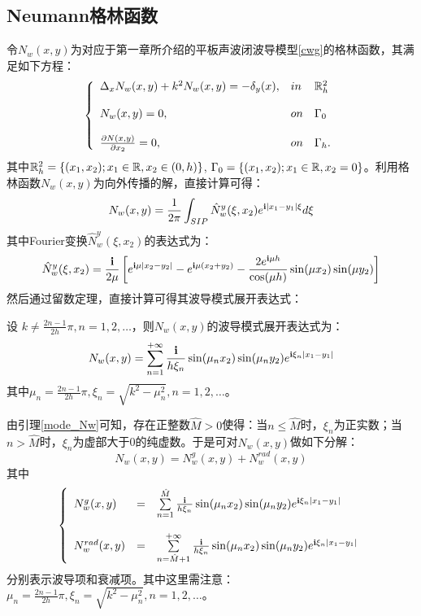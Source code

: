 \subsection{Neumann格林函数}
令$N_w(x,y)$为对应于第一章所介绍的平板声波闭波导模型\ref{cwg}的格林函数，其满足如下方程：
\begin{eqnarray}\label{cwg_neumann}
\left\{
\begin{array}{lll}
\Delta_xN_w(x,y)+k^2N_w(x,y)=-\delta_y(x),&in& \mathbb{R}^2_h\\
& &\\
N_w(x,y)=0, &on&\Gamma_0\\
& &\\
\frac{\partial N(x,y)}{\partial x_2}=0, &on&\Gamma_h.
\end{array}
\right.
\end{eqnarray}
其中$\mathbb{R}^2_h=\{(x_1,x_2);x_1\in \mathbb{R}, x_2\in(0,h)\}$, $ \Gamma_0=\{(x_1,x_2);x_1\in \mathbb{R}, x_2=0\}$。利用格林函数$N_w(x,y)$为向外传播的解，直接计算可得：
\begin{equation}\label{f_Nw}
 N_w(x,y)=\frac{1}{2\pi}\int_{SIP}\hat N_w^y(\xi,x_2)e^{\mathbf{i}|x_1-y_1|\xi}d\xi
\end{equation}
其中Fourier变换$\hat N_w^y(\xi,x_2)$的表达式为：
\begin{equation}
\hat N_w^y(\xi,x_2)=\frac{\mathbf{i}}{2\mu}\left[e^{\mathbf{i}\mu|x_2-y_2|}-e^{\mathbf{i}\mu(x_2+y_2)}-\frac{2e^{\mathbf{i}\mu h}}{\cos(\mu h)}\sin(\mu x_2)\sin(\mu y_2)\right]
\end{equation}
然后通过留数定理，直接计算可得其波导模式展开表达式：
\begin{lemma}\label{mode_Nw}
设 $k\neq\frac{2n-1}{2h}\pi, n=1,2,\ldots$，则$N_w(x,y)$的波导模式展开表达式为：	
\begin{equation}
	N_w(x,y)=\sum\limits_{n=1}^{+\infty}\frac{\mathbf{i}}{h\xi_n}\sin(\mu_nx_2)\sin(\mu_ny_2)e^{\mathbf{i}\xi_n|x_1-y_1|}
\end{equation}
其中$\mu_n=\frac{2n-1}{2h}\pi, \xi_n=\sqrt{k^2-\mu_n^2}, n=1,2,\ldots$。 
\end{lemma}
\begin{remark}
 由引理\ref{mode_Nw}可知，存在正整数$\hat M>0$使得：当$n\leq\hat M$时，$\xi_n$为正实数；当$n>\hat M$时，$\xi_n$为虚部大于0的纯虚数。于是可对$N_w(x,y)$做如下分解：
 \begin{equation}
  N_w(x,y) = N_w^g(x,y)+N_w^{rad}(x,y)
 \end{equation}
其中
\begin{eqnarray}
\left\{
\begin{array}{lll}
 N_w^g(x,y)&=&\sum\limits_{n=1}^{\hat M}\frac{\mathbf{i}}{h\xi_n}\sin(\mu_nx_2)\sin(\mu_ny_2)e^{\mathbf{i}\xi_n|x_1-y_1|}\\
 & &\\
 N_w^{rad}(x,y)&=&\sum\limits_{n=\hat M+1}^{+\infty}\frac{\mathbf{i}}{h\xi_n}\sin(\mu_nx_2)\sin(\mu_ny_2)e^{\mathbf{i}\xi_n|x_1-y_1|}
\end{array}
\right.
\end{eqnarray}
分别表示波导项和衰减项。其中这里需注意：$\mu_n=\frac{2n-1}{2h}\pi, \xi_n=\sqrt{k^2-\mu_n^2},n=1,2,\ldots$。
  
\end{remark}
